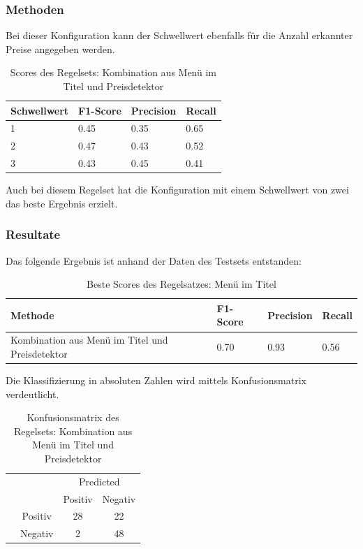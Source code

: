 \subsubsection{Methoden}
Bei dieser Konfiguration kann der Schwellwert ebenfalls für die Anzahl erkannter Preise angegeben werden.\\
\begin{table}[H]
	\caption{Scores des Regelsets: Kombination aus Menü im Titel und Preisdetektor}
	\centering
	\begin{tabular}{|l|l|l|l|}
		\hline
		Schwellwert & F1-Score & Precision & Recall\\
		\hline
		1 & 0.45 & 0.35 & 0.65 \\
		2 & 0.47 & 0.43 & 0.52 \\
		3 & 0.43 & 0.45 & 0.41 \\
		\hline
	\end{tabular}
\end{table}
Auch bei diesem Regelset hat die Konfiguration mit einem Schwellwert von zwei das beste Ergebnis erzielt.
\subsubsection{Resultate}
Das folgende Ergebnis ist anhand der Daten des Testsets entstanden:
\begin{table}[H]
	\caption{Beste Scores des Regelsatzes: Menü im Titel}
	\centering
	\begin{tabular}{|l|l|l|l|}
		\hline
		Methode & F1-Score & Precision & Recall\\
		\hline
		Kombination aus Menü im Titel und Preisdetektor & 0.70 & 0.93 & 0.56\\
		\hline
	\end{tabular}
\end{table}
Die Klassifizierung in absoluten Zahlen wird mittels Konfusionsmatrix verdeutlicht.
\begin{table}[H]
	\caption{Konfusionsmatrix des Regelsets: Kombination aus Menü im Titel und Preisdetektor}
	\centering
	\begin{tabular}{@{}cc|cc@{}}
		\multicolumn{1}{c}{} &\multicolumn{1}{c}{} &\multicolumn{2}{c}{Predicted} \\ 
		\multicolumn{1}{c}{} & 
		\multicolumn{1}{c|}{} & 
		\multicolumn{1}{c}{Positiv} & 
		\multicolumn{1}{c}{Negativ} \\ 
		\cline{2-4}
		\multirow[c]{2}{*}{\rotatebox[origin=tr]{90}{Actual}}
		& Positiv  & 28   & 22   \\[1.5ex]
		& Negativ  & 2   & 48 \\ 
		\cline{2-4}
	\end{tabular}
\end{table}
